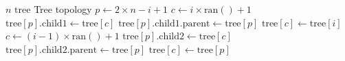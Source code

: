 \begin{algorithmic}[1]
\REQUIRE $n$ 
\REQUIRE $\mathrm{tree}$ 
\ENSURE Tree topology
   \STATE $p\leftarrow 2\times n - i + 1$  %
   \STATE $c\leftarrow i\times \mathrm{ran()} + 1$ 
   \STATE $\mathrm{tree}[p].\mathrm{child}1\leftarrow\mathrm{tree}[c]$ 
   \STATE $\mathrm{tree}[p].\mathrm{child}1.\mathrm{parent}\leftarrow \mathrm{tree}[p]$
   \STATE $\mathrm{tree}[c]\leftarrow\mathrm{tree}[i]$
   \STATE $c\leftarrow (i-1)\times\mathrm{ran()} + 1$ 
   \STATE $\mathrm{tree}[p].\mathrm{child2}\leftarrow\mathrm{tree}[c]$
   \STATE $\mathrm{tree}[p].\mathrm{child2}.\mathrm{parent}\leftarrow\mathrm{tree}[p]$
   \STATE $\mathrm{tree}[c]\leftarrow\mathrm{tree}[p]$
\ENDFOR
\end{algorithmic}
